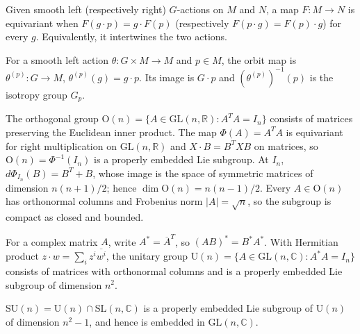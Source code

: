 \begin{definition}
\label{def:7-50-extra-3}



Given smooth left (respectively right) $G$-actions on $M$ and $N$, a map $F:M\to N$ is equivariant when $F(g\cdot p)=g\cdot F(p)$ (respectively $F(p\cdot g)=F(p)\cdot g$) for every $g$. Equivalently, it intertwines the two actions.
\end{definition}

\begin{definition}
\label{def:7-50-extra-4}




For a smooth left action $\theta:G\times M\to M$ and $p\in M$, the orbit map is $\theta^{(p)}:G\to M$, $\theta^{(p)}(g)=g\cdot p$. Its image is $G\cdot p$ and $(\theta^{(p)})^{-1}(p)$ is the isotropy group $G_p$.
\end{definition}

\begin{example}
\label{ex:7-27}




The orthogonal group $\mathrm O(n)=\{A\in\mathrm{GL}(n,\mathbb R):A^TA=I_n\}$ consists of matrices preserving the Euclidean inner product. The map $\Phi(A)=A^TA$ is equivariant for right multiplication on $\mathrm{GL}(n,\mathbb R)$ and $X\cdot B=B^TXB$ on matrices, so $\mathrm O(n)=\Phi^{-1}(I_n)$ is a properly embedded Lie subgroup. At $I_n$, $d\Phi_{I_n}(B)=B^T+B$, whose image is the space of symmetric matrices of dimension $n(n+1)/2$; hence $\dim\mathrm O(n)=n(n-1)/2$. Every $A\in\mathrm O(n)$ has orthonormal columns and Frobenius norm $\lvert A\rvert=\sqrt n$, so the subgroup is compact as closed and bounded.
\end{example}

\begin{example}
\label{ex:7-29}



For a complex matrix $A$, write $A^*=\overline A^T$, so $(AB)^*=B^*A^*$. With Hermitian product $z\cdot w=\sum_i z^i\overline{w^i}$, the unitary group $\mathrm U(n)=\{A\in\mathrm{GL}(n,\mathbb C):A^*A=I_n\}$ consists of matrices with orthonormal columns and is a properly embedded Lie subgroup of dimension $n^2$.
\end{example}

\begin{example}
\label{ex:7-30}



$\mathrm{SU}(n)=\mathrm U(n)\cap\mathrm{SL}(n,\mathbb C)$ is a properly embedded Lie subgroup of $\mathrm U(n)$ of dimension $n^2-1$, and hence is embedded in $\mathrm{GL}(n,\mathbb C)$.
\end{example}

